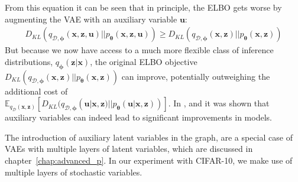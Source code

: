 \documentclass[MAL,biber]{nowfnt} %
\newcommand{\bb}[1]{\mathbf{#1}}
\newcommand{\bx}{\bb{x}}
\newcommand{\bu}{\bb{u}}
\newcommand{\bz}{\bb{z}}
\newcommand{\bT}{\boldsymbol{\theta}}
\newcommand{\bphi}{\boldsymbol{\phi}}
\newcommand{\pT}{p_{\bT}}
\newcommand{\qP}{q_{\bphi}}
\newcommand{\qD}{q_\mathcal{D}}
\newcommand{\qDP}{q_{\mathcal{D},\bphi}}
\newcommand{\Exp}[2]{\mathbb{E}_{#1}\left[#2\right]}
\begin{document}
From this equation it can be seen that in principle, the ELBO gets worse by augmenting the VAE with an auxiliary variable $\bu$:
\begin{align*}
D_{KL}(\qDP(\bx,\bz,\bu) || \pT(\bx,\bz,\bu)) \geq D_{KL}(\qDP(\bx,\bz) || \pT(\bx,\bz))
\end{align*}
But because we now have access to a much more flexible class of inference distributions, $\qP(\bz|\bx)$,
the original ELBO objective $D_{KL}(\qDP(\bx,\bz) ||\allowbreak \pT(\bx,\bz))$ can improve, potentially outweighing the additional cost of \\$\Exp{\qD(\bx,\bz)}{D_{KL}(\qDP(\bu|\bx,\bz) || \pT(\bu|\bx,\bz))}$. In \citep{salimans2015markov}, \citep{ranganath2016hierarchical} and \citep{maaloe2016auxiliary} it was shown that auxiliary variables can indeed lead to significant improvements in models.

The introduction of auxiliary latent variables in the graph, are a special case of VAEs with multiple layers of latent variables, which are discussed in chapter~\ref{chap:advanced_p}. In our experiment with CIFAR-10, we make use of multiple layers of stochastic variables.
\end{document}

